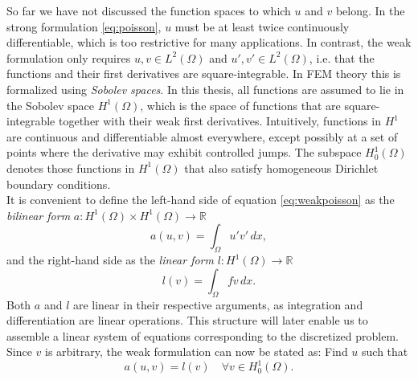 So far we have not discussed the function spaces to which $u$ and $v$ belong. In the strong formulation \eqref{eq:poisson}, $u$ must be at least twice continuously differentiable, which is too restrictive for many applications. In contrast, the weak formulation only requires $u,v\in L^2(\Omega)$ and $u',v' \in L^2(\Omega)$, i.e. that the functions and their first derivatives are square-integrable. In FEM theory this is formalized using \textit{Sobolev spaces}. In this thesis, all functions are assumed to lie in the Sobolev space $H^1(\Omega)$, which is the space of functions that are square-integrable together with their weak first derivatives. Intuitively, functions in $H^1$ are continuous and differentiable almost everywhere, except possibly at a set of points where the derivative may exhibit controlled jumps. The subspace $H^1_0(\Omega)$ denotes those functions in $H^1(\Omega)$ that also satisfy homogeneous Dirichlet boundary conditions.\\

It is convenient to define the left-hand side of equation \eqref{eq:weakpoisson} as the \textit{bilinear form} $a:H^1(\Omega)\times H^1(\Omega)\rightarrow\mathbb{R}$
\begin{equation*}
    a(u,v) = \int_\Omega u'v'\,dx,
\end{equation*}
and the right-hand side as the \textit{linear form} $l:H^1(\Omega)\rightarrow\mathbb{R}$
\begin{equation*}
    l(v) = \int_\Omega f v\,dx.
\end{equation*}
Both $a$ and $l$ are linear in their respective arguments, as integration and differentiation are linear operations. This structure will later enable us to assemble a linear system of equations corresponding to the discretized problem.\\

Since $v$ is arbitrary, the weak formulation can now be stated as: Find $u$ such that
\begin{equation}
    a(u,v) = l(v) \quad \forall v \in H^1_0(\Omega).
    \label{eq:weakgeneral}
\end{equation}

